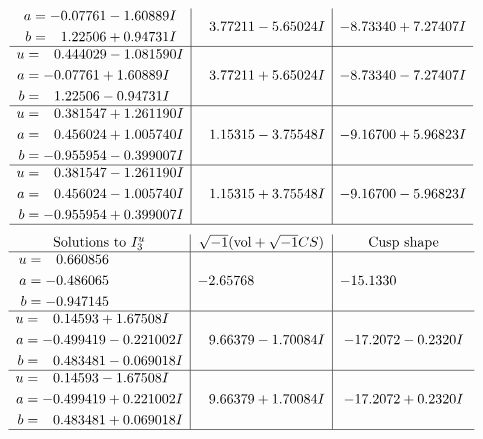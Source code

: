 \documentclass[1p]{elsarticle_modified}
\theoremstyle{definition}
\newcommand{\I}{\sqrt{-1}}
\begin{document}
$$\begin{array}{c|c|c}
\begin{aligned}
a &= -0.07761 - 1.60889 I \\
b &= \phantom{-}1.22506 + 0.94731 I\end{aligned}
 & \phantom{-}3.77211 - 5.65024 I & -8.73340 + 7.27407 I \\ \hline\begin{aligned}
u &= \phantom{-}0.444029 - 1.081590 I \\
a &= -0.07761 + 1.60889 I \\
b &= \phantom{-}1.22506 - 0.94731 I\end{aligned}
 & \phantom{-}3.77211 + 5.65024 I & -8.73340 - 7.27407 I \\ \hline\begin{aligned}
u &= \phantom{-}0.381547 + 1.261190 I \\
a &= \phantom{-}0.456024 + 1.005740 I \\
b &= -0.955954 - 0.399007 I\end{aligned}
 & \phantom{-}1.15315 - 3.75548 I & -9.16700 + 5.96823 I \\ \hline\begin{aligned}
u &= \phantom{-}0.381547 - 1.261190 I \\
a &= \phantom{-}0.456024 - 1.005740 I \\
b &= -0.955954 + 0.399007 I\end{aligned}
 & \phantom{-}1.15315 + 3.75548 I & -9.16700 - 5.96823 I\\
 \hline 
 \end{array}$$\newpage$$\begin{array}{c|c|c}  
\text{Solutions to }I^u_{3}& \I (\text{vol} + \sqrt{-1}CS) & \text{Cusp shape}\\
 \hline 
\begin{aligned}
u &= \phantom{-}0.660856\phantom{ +0.000000I} \\
a &= -0.486065\phantom{ +0.000000I} \\
b &= -0.947145\phantom{ +0.000000I}\end{aligned}
 & -2.65768\phantom{ +0.000000I} & -15.1330\phantom{ +0.000000I} \\ \hline\begin{aligned}
u &= \phantom{-}0.14593 + 1.67508 I \\
a &= -0.499419 - 0.221002 I \\
b &= \phantom{-}0.483481 - 0.069018 I\end{aligned}
 & \phantom{-}9.66379 - 1.70084 I & -17.2072 - 0.2320 I \\ \hline\begin{aligned}
u &= \phantom{-}0.14593 - 1.67508 I \\
a &= -0.499419 + 0.221002 I \\
b &= \phantom{-}0.483481 + 0.069018 I\end{aligned}
 & \phantom{-}9.66379 + 1.70084 I & -17.2072 + 0.2320 I\\
 \hline 
 \end{array}$$\newpage
\end{document}
